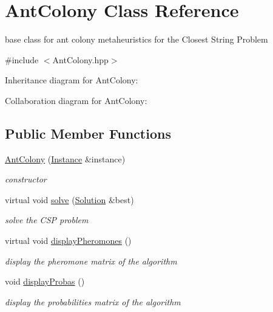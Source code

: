 \hypertarget{classAntColony}{}\section{Ant\+Colony Class Reference}
\label{classAntColony}


base class for ant colony metaheuristics for the Closest String Problem  




{\ttfamily \#include $<$Ant\+Colony.\+hpp$>$}



Inheritance diagram for Ant\+Colony\+:


Collaboration diagram for Ant\+Colony\+:
\subsection*{Public Member Functions}
\begin{DoxyCompactItemize}
\item 
\hyperlink{classAntColony_a082dd31637cdb16ea30ae7d970acff90}{Ant\+Colony} (\hyperlink{classInstance}{Instance} \&instance)
\begin{DoxyCompactList}\small\item\em constructor \end{DoxyCompactList}\item 
virtual void \hyperlink{classAntColony_a2928867b4646afc1c3d553848ed093aa}{solve} (\hyperlink{classSolution}{Solution} \&best)
\begin{DoxyCompactList}\small\item\em solve the C\+SP problem \end{DoxyCompactList}\item 
virtual void \hyperlink{classAntColony_a1cc0338e6d7d5be3cc190b1d037b569e}{display\+Pheromones} ()\hypertarget{classAntColony_a1cc0338e6d7d5be3cc190b1d037b569e}{}\label{classAntColony_a1cc0338e6d7d5be3cc190b1d037b569e}

\begin{DoxyCompactList}\small\item\em display the pheromone matrix of the algorithm \end{DoxyCompactList}\item 
void \hyperlink{classAntColony_afe90d8ff57da5f0a7411b7a8c7f4b009}{display\+Probas} ()\hypertarget{classAntColony_afe90d8ff57da5f0a7411b7a8c7f4b009}{}\label{classAntColony_afe90d8ff57da5f0a7411b7a8c7f4b009}

\begin{DoxyCompactList}\small\item\em display the probabilities matrix of the algorithm \end{DoxyCompactList}\end{DoxyCompactItemize}
